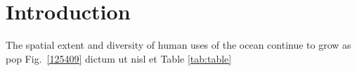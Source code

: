 \section{Introduction}
\label{introduction}

The spatial extent and diversity of human uses of the ocean continue to grow as pop Fig.~\ref{125409} dictum ut nisl et Table \ref{tab:table}
